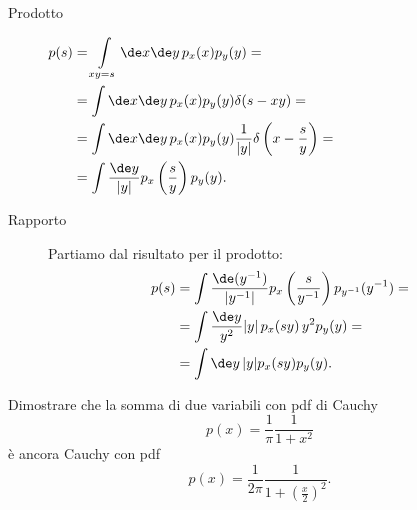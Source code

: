 \begin{solution}
	\begin{description}
		\item[Prodotto]
			$\begin{aligned}[t]
				p(s) &= \int\limits_{xy=s} \de x\de y\, p_x(x) p_y(y) = \\
				&= \int\de x\de y\, p_x(x)p_y(y)\delta(s-xy) = \\
				&= \int\de x\de y\, p_x(x)p_y(y)\frac1{|y|}\delta\left(x-\frac sy\right) = \\
				&= \int\frac{\de y}{|y|}p_x\left(\frac sy\right)p_y(y).
			\end{aligned}$
		\item[Rapporto]
			Partiamo dal risultato per il prodotto:
			\begin{align*}
				p(s) &= \int\frac{\de(y^{-1})}{|y^{-1}|}p_x\left(\frac s{y^{-1}}\right)p_{y^{-1}}(y^{-1}) = \\
				&= \int\frac{\de y}{y^2}|y|\,p_x(sy)\,y^2 p_y(y) = \\
				&= \int\de y\, |y|p_x(sy)p_y(y).
			\end{align*}
	\end{description}
\end{solution}

\begin{ex}
	\label{th:sumcauchy}
	Dimostrare che la somma di due variabili con pdf di Cauchy
	\begin{equation*}
		p(x) = \frac1\pi \frac1{1+x^2}
	\end{equation*}
	è ancora Cauchy con pdf
	\begin{equation*}
		p(x) = \frac1{2\pi} \frac1{1 + \left(\frac x2\right)^2}.
	\end{equation*}
\end{ex}

